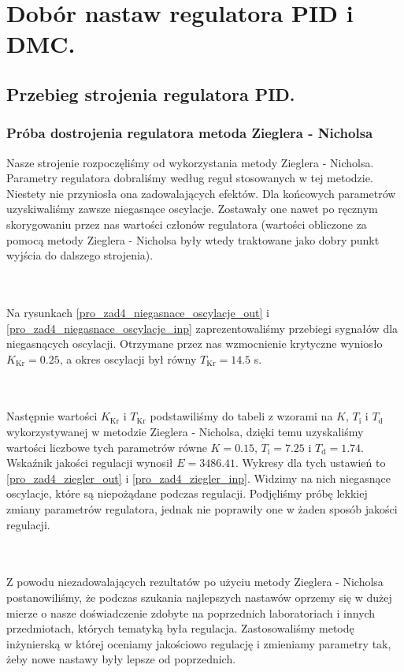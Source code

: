 \chapter{Dobór nastaw regulatora PID i DMC.}
\label{pro4_PID}

\section{Przebieg strojenia regulatora PID.}
\subsection{Próba dostrojenia regulatora metoda Zieglera - Nicholsa}
Nasze strojenie rozpoczęliśmy od wykorzystania metody Zieglera - Nicholsa. Parametry regulatora dobraliśmy według reguł stosowanych w tej metodzie. Niestety nie przyniosła ona zadowalających efektów. Dla końcowych parametrów uzyskiwaliśmy zawsze niegasnące oscylacje. Zostawały one nawet po ręcznym skorygowaniu przez nas wartości członów regulatora (wartości obliczone za pomocą metody Zieglera - Nicholsa były wtedy traktowane jako dobry punkt wyjścia do dalszego strojenia).

~\\\\Na rysunkach \ref{pro_zad4_niegasnace_oscylacje_out} i \ref{pro_zad4_niegasnace_oscylacje_inp} zaprezentowaliśmy przebiegi sygnałów dla niegasnących oscylacji. Otrzymane przez nas wzmocnienie krytyczne wyniosło $K_{\mathrm{Kr}} = 0.25$, a okres oscylacji był równy $T_{\mathrm{Kr}} = \num{14.5}$ s. 

~\\\\ Następnie wartości $K_{\mathrm{Kr}}$ i $T_{\mathrm{Kr}}$ podstawiliśmy do tabeli z wzorami na $K$, $T_{\mathrm{i}}$ i $T_{\mathrm{d}}$ wykorzystywanej w metodzie Zieglera - Nicholsa, dzięki temu uzyskaliśmy wartości liczbowe tych parametrów równe $K = \num{0.15}$, $T_{\mathrm{i}} = \num{7.25}$ i $T_{\mathrm{d}} = \num{1.74}$. Wskaźnik jakości regulacji wynosił $E = \num{3486.41}$. Wykresy dla tych ustawień to \ref{pro_zad4_ziegler_out} i \ref{pro_zad4_ziegler_inp}. Widzimy na nich niegasnące oscylacje, które są niepożądane podczas regulacji. Podjęliśmy próbę lekkiej zmiany parametrów regulatora, jednak nie poprawiły one w żaden sposób jakości regulacji. 

~\\\\ Z powodu niezadowalających rezultatów po użyciu metody Zieglera - Nicholsa postanowiliśmy, że podczas szukania najlepszych nastawów oprzemy się w dużej mierze o nasze doświadczenie zdobyte na poprzednich laboratoriach i innych przedmiotach, których tematyką była regulacja. Zastosowaliśmy metodę inżynierską w której oceniamy jakościowo regulację i zmieniamy parametry tak, żeby nowe nastawy były lepsze od poprzednich. 


